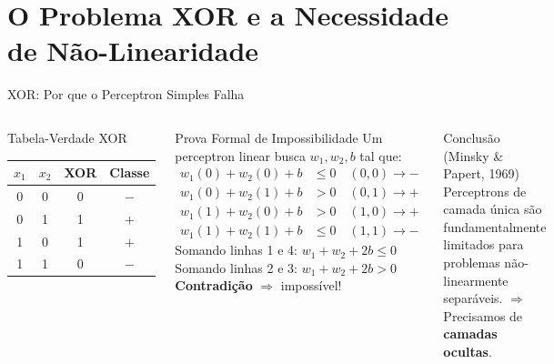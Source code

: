 \documentclass[7pt, aspectratio=169,10pt]{beamer}
\begin{document}
\section{O Problema XOR e a Necessidade de Não-Linearidade}

\begin{frame}{XOR: Por que o Perceptron Simples Falha}
\begin{columns}[T]
\begin{block}{Tabela-Verdade XOR}
\centering\small
\begin{tabular}{cccc}
\toprule
$x_1$ & $x_2$ & XOR & Classe \\
\midrule
0 & 0 & 0 & $-$ \\
0 & 1 & 1 & $+$ \\
1 & 0 & 1 & $+$ \\
1 & 1 & 0 & $-$ \\
\bottomrule
\end{tabular}
\end{block}
\vspace{8pt}
\begin{alertblock}{Prova Formal de Impossibilidade}
\small
Um perceptron linear busca $w_1,w_2,b$ tal que:
\begin{align*}
  w_1(0)+w_2(0)+b &\leq 0 \quad (0,0)\to- \\
  w_1(0)+w_2(1)+b &> 0 \quad (0,1)\to+ \\
  w_1(1)+w_2(0)+b &> 0 \quad (1,0)\to+ \\
  w_1(1)+w_2(1)+b &\leq 0 \quad (1,1)\to-
\end{align*}
Somando linhas 1 e 4: $w_1+w_2+2b \leq 0$\\
Somando linhas 2 e 3: $w_1+w_2+2b > 0$\\
\textbf{Contradição} $\Rightarrow$ impossível!
\end{alertblock}
\begin{block}{Conclusão (Minsky \& Papert, 1969)}
\small
Perceptrons de camada única são fundamentalmente limitados para problemas não-linearmente separáveis. $\Rightarrow$ Precisamos de \textbf{camadas ocultas}.
\end{block}
\end{columns}
\end{frame}
\end{document}

